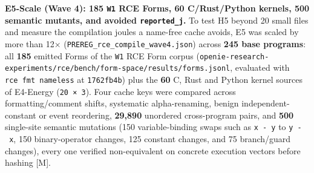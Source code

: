 \documentclass[10pt,letterpaper]{article}
\begin{document}
\textbf{E5-Scale (Wave 4): 185 \texttt{W1} RCE Forms, 60 C/Rust/Python
kernels, 500 semantic mutants, and avoided \texttt{reported\_\allowbreak{}j}.} To
test H5 beyond 20 small files and measure the compilation joules a
name-free cache avoids, E5 was scaled by more than 12×
(\texttt{PREREG\_\allowbreak{}rce\_\allowbreak{}compile\_\allowbreak{}wave4.\allowbreak{}json}) across \textbf{245 base
programs}: all \textbf{185} emitted Forms of the \texttt{W1} RCE Form
corpus
(\texttt{openie-\allowbreak{}research-\allowbreak{}experiments/\allowbreak{}rce/\allowbreak{}bench/\allowbreak{}form-\allowbreak{}space/\allowbreak{}results/\allowbreak{}forms.\allowbreak{}jsonl},
evaluated with \texttt{rce\ fmt\ nameless} at \texttt{1762fb4b}) plus
the \textbf{60} C, Rust and Python kernel sources of E4-Energy
(\texttt{20\ ×\ 3}). Four cache keys were compared across
formatting/comment shifts, systematic alpha-renaming, benign
independent-constant or event reordering, \textbf{29,890} unordered
cross-program pairs, and \textbf{500} single-site semantic mutations
(150 variable-binding swaps such as \texttt{x\ -\ y} to
\texttt{y\ -\ x}, 150 binary-operator changes, 125 constant changes, and
75 branch/guard changes), every one verified non-equivalent on concrete
execution vectors before hashing {[}M{]}.
\end{document}
